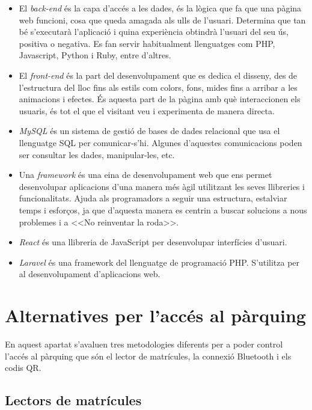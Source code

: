 \begin{itemize}
    \item El \emph{back-end} és la capa d'accés a les dades, és la lògica que fa que una pàgina web funcioni,
    cosa que queda amagada als ulls de l'usuari. Determina que tan bé s'executarà l'aplicació i quina
    experiència obtindrà l'usuari del seu ús, positiva o negativa.
    Es fan servir habitualment llenguatges com PHP, Javascript, Python i Ruby, entre d'altres.
    \item El \emph{front-end} és la part del desenvolupament que es dedica el disseny,
    des de l'estructura del lloc fins als estils com colors, fons, mides fins a arribar a les animacions i efectes.
    És aquesta part de la pàgina amb què interaccionen els usuaris, és tot el que el visitant veu i experimenta
    de manera directa.
    \item \emph{MySQL} és un sistema de gestió de bases de dades relacional que usa el llenguatge SQL per comunicar-s'hi. Algunes
    d'aquestes comunicacions poden ser consultar les dades, manipular-les, etc.
    \item Una \emph{framework} és una eina de desenvolupament web que ens permet desenvolupar aplicacions d'una
    manera més àgil utilitzant les seves llibreries i funcionalitats. Ajuda als programadors a seguir una estructura,
    estalviar temps i esforços, ja que d'aquesta manera es centrin a buscar solucions a nous problemes i a <<No reinventar la roda>>.
    \item \emph{React} \autocite{react} és una llibreria de JavaScript per desenvolupar interfícies d'usuari.
    \item \emph{Laravel} \autocite{laravel} és una framework del llenguatge de programació PHP.
    S'utilitza per al desenvolupament d'aplicacions web.
\end{itemize}

\newpage
\section{Alternatives per l'accés al pàrquing}
\label{sec:alternatives}

En aquest apartat s'avaluen tres metodologies
diferents per a poder control l'accés al pàrquing que són el lector de
matrícules, la connexió Bluetooth i els codis QR.

\subsection{Lectors de matrícules}


